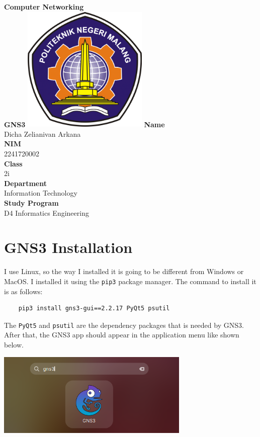 \documentclass[12pt,titlepage]{article}
\newcommand{\vSubject}{Computer Networking}
\newcommand{\vSubtitle}{GNS3}
\newcommand{\vName}{Dicha Zelianivan Arkana}
\newcommand{\vNIM}{2241720002}
\newcommand{\vClass}{2i}
\newcommand{\vDepartment}{Information Technology}
\newcommand{\vStudyProgram}{D4 Informatics Engineering}
\begin{document}
\begin{titlepage}
    \centering
    \vfill
    {\bfseries\LARGE
        \vSubject\\
        \vskip0.25cm
        \vSubtitle
    }
    \vfill
    \includegraphics[width=6cm]{images/polinema-logo.png}
    \vfill
    {
        \textbf{Name}\\
        \vName\\
        \vskip0.5cm
        \textbf{NIM}\\
        \vNIM\\
        \vskip0.5cm
        \textbf{Class}\\
        \vClass\\
        \vskip0.5cm
        \textbf{Department}\\
        \vDepartment\\
        \vskip0.5cm
        \textbf{Study Program}\\
        \vStudyProgram
    }
\end{titlepage}

\section{GNS3 Installation}

I use Linux, so the way I installed it is going to be different from Windows or MacOS. I installed it
using the \texttt{pip3} package manager. The command to install it is as follows:

\begin{verbatim}
    pip3 install gns3-gui==2.2.17 PyQt5 psutil
\end{verbatim}

The \texttt{PyQt5} and \texttt{psutil} are the dependency packages that is needed by GNS3. After
that, the GNS3 app should appear in the application menu like shown below.

\begin{center}
    \includegraphics[height=4cm]{./images/gns-application-list.png}
\end{center}
\end{document}
